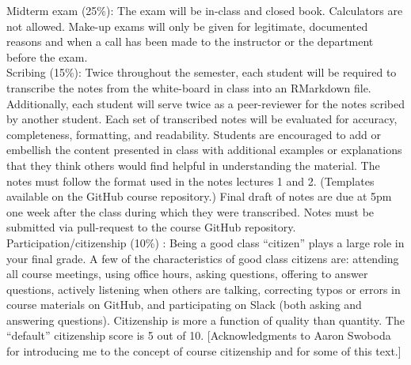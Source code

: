 \documentclass[10pt]{article}
\begin{document}
\noindent Midterm exam (25\%): The exam will be in-class and closed book. Calculators are not allowed. Make-up exams will only be given for legitimate, documented reasons and when a call has been made to the instructor or the department before the exam. \\

\noindent Scribing (15\%): Twice throughout the semester, each student will be required to transcribe the notes from the white-board in class into an RMarkdown file. Additionally, each student will serve twice as a peer-reviewer for the notes scribed by another student. Each set of transcribed notes will be evaluated for accuracy, completeness, formatting, and readability. Students are encouraged to add or embellish the content presented in class with additional examples or explanations that they think others would find helpful in understanding the material. The notes must follow the format used in the notes lectures 1 and 2. (Templates available on the GitHub course repository.) Final draft of notes are due at 5pm one week after the class during which they were transcribed. Notes must be submitted via pull-request to the course GitHub repository. \\

\noindent Participation/citizenship (10\%) :
Being a good class ``citizen'' plays a large role in your final grade. A few of the characteristics of good class citizens are: attending all course meetings, using office hours, asking questions, offering to answer questions, actively listening when others are talking, correcting typos or errors in course materials on GitHub, and participating on Slack (both asking and answering questions). Citizenship is more a function of quality than quantity. The ``default'' citizenship score is 5 out of 10. [Acknowledgments to Aaron Swoboda for introducing me to the concept of course citizenship and for some of this text.] \\
\end{document}
